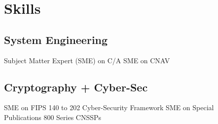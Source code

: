 \documentclass{clinton-resume} %
\begin{document}
\begin{minipage}[t]{0.33\textwidth}


\section{Skills}

\subsection{System Engineering}

Subject Matter Expert (SME) on C/A \textbullet{} SME on CNAV
\sectionspace %
\subsection{Cryptography + Cyber-Sec}
SME on FIPS 140 to 202\textbullet{} Cyber-Security Framework \textbullet{} SME on Special Publications 800 Series \textbullet{} CNSSPs \\

\sectionspace %


\end{minipage} %
\hfill
%
%
\end{document}
